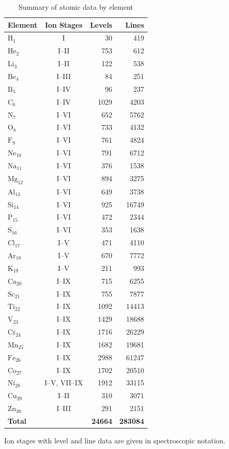\documentclass{article}
\begin{document}
\begin{table}[p]
\centering
\caption{Summary of atomic data by element\label{tab:atomdata-summary}}
\small
\renewcommand{\arraystretch}{1.12}
\begin{tabular*}{0.9\textwidth}{@{\extracolsep{\fill}}lcrr}
\hline
\textbf{Element} & \textbf{Ion Stages} & \textbf{Levels} & \textbf{Lines} \\
\hline
$\mathrm{H}_{1}$ & I & 30 & 419 \\
$\mathrm{He}_{2}$ & I--II & 753 & 612 \\
$\mathrm{Li}_{3}$ & I--II & 122 & 538 \\
$\mathrm{Be}_{4}$ & I--III & 84 & 251 \\
$\mathrm{B}_{5}$ & I--IV & 96 & 237 \\
$\mathrm{C}_{6}$ & I--IV & 1029 & 4203 \\
$\mathrm{N}_{7}$ & I--VI & 652 & 5762 \\
$\mathrm{O}_{8}$ & I--VI & 733 & 4132 \\
$\mathrm{F}_{9}$ & I--VI & 761 & 4824 \\
$\mathrm{Ne}_{10}$ & I--VI & 791 & 6712 \\
$\mathrm{Na}_{11}$ & I--VI & 376 & 1538 \\
$\mathrm{Mg}_{12}$ & I--VI & 894 & 3275 \\
$\mathrm{Al}_{13}$ & I--VI & 649 & 3738 \\
$\mathrm{Si}_{14}$ & I--VI & 925 & 16749 \\
$\mathrm{P}_{15}$ & I--VI & 472 & 2344 \\
$\mathrm{S}_{16}$ & I--VI & 353 & 1638 \\
$\mathrm{Cl}_{17}$ & I--V & 471 & 4110 \\
$\mathrm{Ar}_{18}$ & I--V & 670 & 7772 \\
$\mathrm{K}_{19}$ & I--V & 211 & 993 \\
$\mathrm{Ca}_{20}$ & I--IX & 715 & 6255 \\
$\mathrm{Sc}_{21}$ & I--IX & 755 & 7877 \\
$\mathrm{Ti}_{22}$ & I--IX & 1092 & 14413 \\
$\mathrm{V}_{23}$ & I--IX & 1429 & 18688 \\
$\mathrm{Cr}_{24}$ & I--IX & 1716 & 26229 \\
$\mathrm{Mn}_{25}$ & I--IX & 1682 & 19681 \\
$\mathrm{Fe}_{26}$ & I--IX & 2988 & 61247 \\
$\mathrm{Co}_{27}$ & I--IX & 1702 & 20510 \\
$\mathrm{Ni}_{28}$ & I--V, VII--IX & 1912 & 33115 \\
$\mathrm{Cu}_{29}$ & I--II & 310 & 3071 \\
$\mathrm{Zn}_{30}$ & I--III & 291 & 2151 \\
\textbf{Total} &  & \textbf{24664} & \textbf{283084} \\
\hline
\end{tabular*}

\medskip
\parbox{0.9\textwidth}{\footnotesize Ion stages with level and line data are given in spectroscopic notation.}
\end{table}
\end{document}
